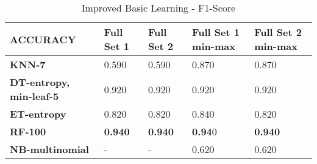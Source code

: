 \documentclass[10pt, conference, compsocconf]{IEEEtran}
\begin{document}
\begin{center}
	\begin{table}[b]
		\centering \footnotesize
		\vspace{0.01cm}
		\caption{Improved Basic Learning - F1-Score}
		\hspace{1cm}
		\begin{tabularx}{\linewidth}{ l  X  X  X  X }
			\hline
			\textbf{ACCURACY} &	\textbf{Full Set 1}&	\textbf{Full Set 2}&	\textbf{Full Set 1 min-max}&	\textbf{Full Set 2 min-max} \\ \hline
			
			
			\textbf{KNN-7}&  0.590&	0.590&	0.870&	0.870 \\ \hline
			\textbf{DT-entropy, min-leaf-5}&  0.920	&0.920&	0.920&	0.920	 \\ \hline
			\textbf{ET-entropy}&  0.820&	0.820&	0.840&	0.820	\\ \hline
			\textbf{RF-100}& \textbf{0.940}&	\textbf{0.940}&	\textbf{0.94}0&	\textbf{0.940}	 \\ \hline
			\textbf{NB-multinomial}&  -&	-&	0.620&	0.620 \\ \hline
			
			
		\end{tabularx}\newline
		\vspace{-0.05cm}
		\label{Table4}
	\end{table} \hfil
\end{center}


%	
\end{document}
